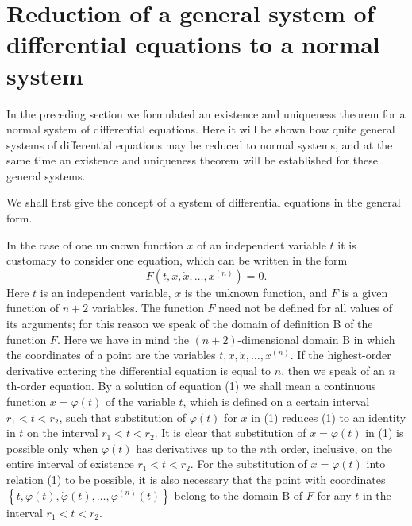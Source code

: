 \documentclass[10pt,a5paper]{book}
\theoremstyle{plain}
\theoremstyle{definition}
\theoremstyle{remark}
\begin{document}
\section{Reduction of a general system of differential equations to a normal system}
In the preceding section we formulated an existence and uniqueness theorem for a normal system of differential equations. Here it will be shown how quite general systems of differential equations may be reduced to normal systems, and at the same time an existence and uniqueness theorem will be established for these general systems.

We shall first give the concept of a system of differential equations in the general form.

In the case of one unknown function $x$ of an independent variable $t$ it is customary to consider one equation, which can be written in the form
\begin{equation*}
F\left(t, x, \dot{x}, \ldots, x^{(n)}\right)=0 . \tag{1}
\end{equation*}
Here $t$ is an independent variable, $x$ is the unknown function, and $F$ is a given function of $n+2$ variables. The function $F$ need not be defined for all values of its arguments; for this reason we speak of the domain of definition B of the function $F$. Here we have in mind the $(n+2)$-dimensional domain B in which the coordinates of a point are the variables $t, x, \dot{x}, \ldots, x^{(n)}$. If the highest-order derivative entering the differential equation is equal to $n$, then we speak of an $n$ th-order equation. By a solution of equation (1) we shall mean a continuous function $x=\varphi(t)$ of the variable $t$, which is defined on a certain interval $r_{1}<t<r_{2}$, such that substitution of $\varphi(t)$ for $x$ in (1) reduces (1) to an identity in $t$ on the interval $r_{1}<t<r_{2}$. It is clear that substitution of $x=\varphi(t)$ in (1) is possible only when $\varphi(t)$ has derivatives up to the $n$th order, inclusive, on the entire interval of existence $r_{1}<t<r_{2}$. For the substitution of $x=\varphi(t)$ into relation (1) to be possible, it is also necessary that the point with coordinates $\left\{t, \varphi(t), \dot{\varphi}(t), \ldots, \varphi^{(n)}(t)\right\}$ belong to the domain B of $F$ for any $t$ in the interval $r_{1}<t<r_{2}$.
\end{document}
